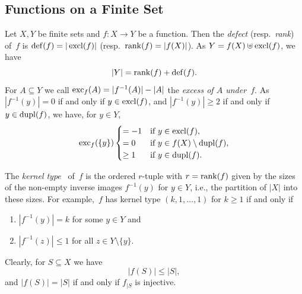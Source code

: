 \subsection{Functions on a Finite Set}
\label{prelim:subsec:func:finite}

\label{def:defect}
\label{def:rank}
\label{def:kernel-type}
\label{def:excess}
Let $X,Y$ be finite sets and $f \colon X \to Y$ be a function.
Then the \emph{defect} (resp.~\emph{rank}) of~$f$
is $\operatorname{def}(f) = |\operatorname{excl}(f)|$ (resp.~$\operatorname{rank}(f) = |f(X)|$).
As $Y = f(X) \uplus \operatorname{excl}(f)$, we have
\begin{equation} \label{prelim:prop:item:rank-defect-eqn}
	|Y| = \operatorname{rank}(f) + \operatorname{def}(f).
\end{equation}
For $A \subseteq Y$ we call $\operatorname{exc}_{f}(A) = |f^{-1}(A)| - |A|$
the \emph{excess of $A$ under~$f$}. 
As $|f^{-1}(y)| = 0$ if and only if $y \in \operatorname{excl}(f)$, and $|f^{-1}(y)| \ge 2$
if and only if $y \in \operatorname{dupl}(f)$, we have, for $y \in Y$,
\begin{equation} \label{prelim:eqn:excess-cases}
\operatorname{exc}_{f}(\{y\})
\begin{cases}
	= -1 & \text{if } y \in \operatorname{excl}(f), \\
	= 0  & \text{if } y \in f(X) \setminus \operatorname{dupl}(f), \\
	\ge 1 & \text{if } y \in \operatorname{dupl}(f).
\end{cases}
\end{equation}	

The \emph{kernel type}~\cite{AraujoCameron2014} of~$f$ is the ordered $r$-tuple
with $r = \operatorname{rank}(f)$ 
given by the sizes of the non-empty inverse images $f^{-1}(y)$ for $y \in Y$,
i.e., the partition of $|X|$ into these sizes.
For example,~$f$ has kernel type $(k,1,\ldots,1)$ for $k \ge 1$ if and only if
\begin{enumerate}
	\item $|f^{-1}(y)| = k$ for some $y \in Y$ and
	\item $|f^{-1}(z)| \le 1$ for all $z \in Y \setminus \{y\}$.
\end{enumerate}
Clearly, for $S \subseteq X$ we have
\begin{equation} \label{eqn:subset-mapped-to-smaller-set}
	|f(S)| \le |S|,
\end{equation}
and $|f(S)| = |S|$ if and only if $f_{|S}$ is injective.

